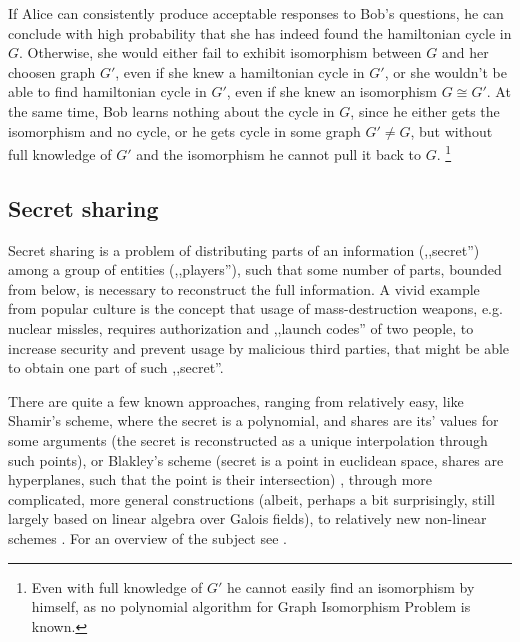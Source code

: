 \documentclass[10pt]{article}
\begin{document}
If Alice can consistently produce acceptable responses to Bob's questions, he can conclude with high
probability that she has indeed found the hamiltonian cycle in \(G\). Otherwise, she would either fail
to exhibit isomorphism between \(G\) and her choosen graph \(G'\), even if she knew a hamiltonian
cycle in \(G'\), or she wouldn't be able to find hamiltonian cycle in \(G'\), even if she knew an
isomorphism \(G\cong G'\). At the same time, Bob learns nothing about the cycle in \(G\), since he
either gets the isomorphism and no cycle, or he gets cycle in some graph \(G'\neq G\), but without
full knowledge of \(G'\) and the isomorphism he cannot pull it back to \(G\).
\footnote{Even with full knowledge of \(G'\) he cannot easily find an isomorphism by himself, as no
polynomial algorithm for Graph Isomorphism Problem is known.}


\subsection{Secret sharing}

Secret sharing is a problem of distributing parts of an information (,,secret'') among a group of
entities (,,players''), such that some number of parts, bounded from below, is necessary to 
reconstruct the full information. A vivid example from popular culture is the concept that usage
of mass-destruction weapons, e.g. nuclear missles, requires authorization and ,,launch codes'' of
two people, to increase security and prevent usage by malicious third parties, that might be able
to obtain one part of such ,,secret''.

There are quite a few known approaches, ranging from relatively easy, like Shamir's scheme, where
the secret is a polynomial, and shares are its' values for some arguments (the secret is reconstructed
as a unique interpolation through such points), or Blakley's scheme (secret is a point in euclidean
space, shares are hyperplanes, such that the point is their intersection) \footnotemark, through more
complicated, more general constructions (albeit, perhaps a bit surprisingly, still largely based on linear
algebra over Galois fields), to relatively new non-linear schemes \cite{Beimel01onthe}. For an overview 
of the subject see \cite{SharingSurvey}.

\end{document}
